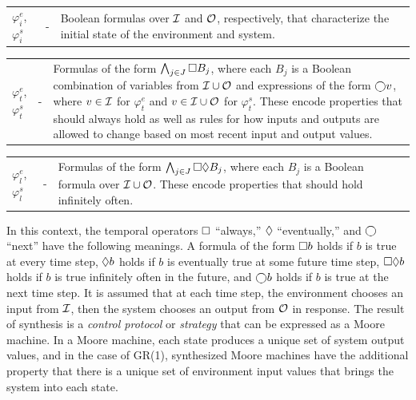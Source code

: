 \documentclass[runningheads]{llncs}
\begin{document}
\vspace{0.5em}

\noindent \begin{xtabular}{p{.045\columnwidth}p{.015\columnwidth}p{.860\columnwidth}}
 $\varphi^e_i$, $\varphi^s_i$ & - & Boolean formulas over $\mathcal{I}$ and $\mathcal{O}$, respectively, that characterize the initial state of the environment and system.
\end{xtabular}

\noindent \begin{xtabular}{p{.045\columnwidth}p{.015\columnwidth}p{.860\columnwidth}}
 $\varphi^e_t$, $\varphi^s_t$ & - &  Formulas of the form $\bigwedge_{j \in J} \square B_j$, where each $B_j$ is a Boolean combination of variables from $\mathcal{I} \cup \mathcal{O}$ and expressions of the form $\varbigcirc v$, where $v \in \mathcal{I}$ for $\varphi^e_t$ and $v \in \mathcal{I} \cup \mathcal{O}$ for $\varphi^s_t$. These encode properties that should always hold as well as rules for how inputs and outputs are allowed to change based on most recent input and output values.
\end{xtabular}

\noindent \begin{xtabular}{p{.045\columnwidth}p{.015\columnwidth}p{.860\columnwidth}}
$\varphi^e_l$, $\varphi^s_l$ & - & Formulas of the form $\bigwedge_{j \in J} \square \lozenge B_j$, where each $B_j$ is a Boolean formula over $\mathcal{I} \cup \mathcal{O}$. These encode properties that should hold infinitely often.
\end{xtabular}

\vspace{0.5em}

\noindent 
In this context, the temporal operators $\square$ ``always,'' $\lozenge$ ``eventually,'' and $\varbigcirc$  ``next'' have the following meanings. 
A formula of the form $\square b$ holds if $b$ is true at every time step, 
$\lozenge b$ holds if $b$ is eventually true at some future time step, 
$\square \lozenge b$ holds if $b$ is true infinitely often in the future, 
and $\varbigcirc b$ holds if $b$ is true at the next time step. 
It is assumed that at each time step, the environment chooses an input from $\mathcal{I}$, then the system chooses an output from $\mathcal{O}$ in response. 
The result of synthesis is a \emph{control protocol} or \emph{strategy} that can be expressed as a Moore machine. 
In a Moore machine, each state produces a unique set of system output values, 
and in the case of GR(1), synthesized Moore machines have the additional property that 
there is a unique set of environment input values that brings the system into each state.
\end{document}
